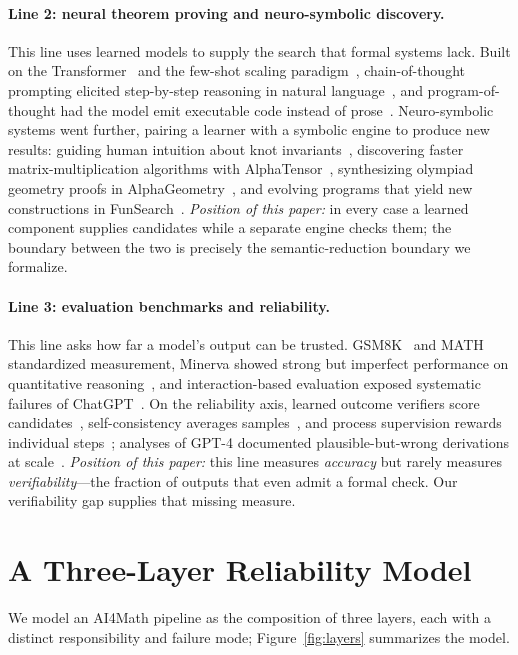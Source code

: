 \documentclass[11pt]{article}
\theoremstyle{definition}
\theoremstyle{plain}
\theoremstyle{remark}
\begin{document}
\paragraph{Line 2: neural theorem proving and neuro-symbolic discovery.}
This line uses learned models to supply the search that formal systems lack. Built on the
Transformer~\cite{vaswani2017} and the few-shot scaling paradigm~\cite{brown2020},
chain-of-thought prompting elicited step-by-step reasoning in natural language~\cite{wei2022},
and program-of-thought had the model emit executable code instead of prose~\cite{gao2023pal}.
Neuro-symbolic systems went further, pairing a learner with a symbolic engine to produce new
results: guiding human intuition about knot invariants~\cite{davies2021}, discovering faster
matrix-multiplication algorithms with AlphaTensor~\cite{fawzi2022}, synthesizing olympiad
geometry proofs in AlphaGeometry~\cite{trinh2024}, and evolving programs that yield new
constructions in FunSearch~\cite{romera2024}. \emph{Position of this paper:} in every case a
learned component supplies candidates while a separate engine checks them; the boundary
between the two is precisely the semantic-reduction boundary we formalize.

\paragraph{Line 3: evaluation benchmarks and reliability.}
This line asks how far a model's output can be trusted. GSM8K~\cite{cobbe2021} and
MATH~\cite{hendrycks2021} standardized measurement, Minerva showed strong but imperfect
performance on quantitative reasoning~\cite{lewkowycz2022}, and interaction-based evaluation
exposed systematic failures of ChatGPT~\cite{frieder2023,collins2024}. On the reliability axis,
learned outcome verifiers score candidates~\cite{cobbe2021}, self-consistency averages
samples~\cite{wang2023selfconsistency}, and process supervision rewards individual
steps~\cite{lightman2024}; analyses of GPT-4 documented plausible-but-wrong derivations at
scale~\cite{achiam2023,bubeck2023}. \emph{Position of this paper:} this line measures
\emph{accuracy} but rarely measures \emph{verifiability}---the fraction of outputs that even
admit a formal check. Our verifiability gap supplies that missing measure.

\section{A Three-Layer Reliability Model}\label{sec:model}
We model an AI4Math pipeline as the composition of three layers, each with a distinct
responsibility and failure mode; Figure~\ref{fig:layers} summarizes the model.
\end{document}
